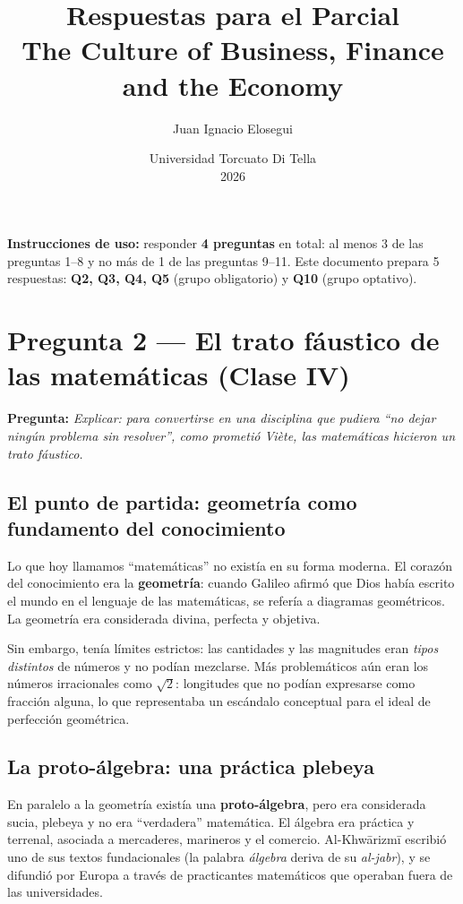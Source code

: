 \documentclass[a4paper,12pt]{article}
\title{\vspace{-2cm}\textbf{Respuestas para el Parcial}\\[0.2cm]
\large The Culture of Business, Finance and the Economy}
\author{Juan Ignacio Elosegui}
\date{Universidad Torcuato Di Tella \\ 2026}
\begin{document}
\maketitle

\noindent\textbf{Instrucciones de uso:} responder \textbf{4 preguntas} en total: al menos 3 de las preguntas 1--8 y no más de 1 de las preguntas 9--11. Este documento prepara 5 respuestas: \textbf{Q2, Q3, Q4, Q5} (grupo obligatorio) y \textbf{Q10} (grupo optativo).

\vspace{1em}

\section{Pregunta 2 — El trato fáustico de las matemáticas (Clase IV)}

\textbf{Pregunta:} \textit{Explicar: para convertirse en una disciplina que pudiera ``no dejar ningún problema sin resolver'', como prometió Viète, las matemáticas hicieron un trato fáustico.}

\subsection*{El punto de partida: geometría como fundamento del conocimiento}

Lo que hoy llamamos ``matemáticas'' no existía en su forma moderna. El corazón del conocimiento era la \textbf{geometría}: cuando Galileo afirmó que Dios había escrito el mundo en el lenguaje de las matemáticas, se refería a diagramas geométricos. La geometría era considerada divina, perfecta y objetiva.

Sin embargo, tenía límites estrictos: las cantidades y las magnitudes eran \textit{tipos distintos} de números y no podían mezclarse. Más problemáticos aún eran los números irracionales como $\sqrt{2}$: longitudes que no podían expresarse como fracción alguna, lo que representaba un escándalo conceptual para el ideal de perfección geométrica.

\subsection*{La proto-álgebra: una práctica plebeya}

En paralelo a la geometría existía una \textbf{proto-álgebra}, pero era considerada sucia, plebeya y no era ``verdadera'' matemática. El álgebra era práctica y terrenal, asociada a mercaderes, marineros y el comercio. Al-Khw\={a}rizm\={i} escribió uno de sus textos fundacionales (la palabra \textit{álgebra} deriva de su \textit{al-jabr}), y se difundió por Europa a través de practicantes matemáticos que operaban fuera de las universidades.
\end{document}
